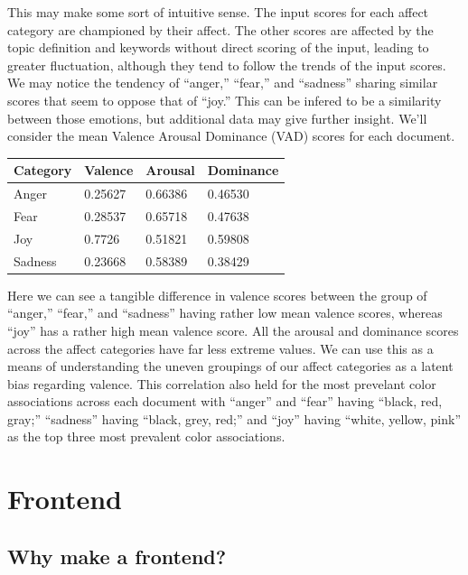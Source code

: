 \documentclass[11pt, twoside, reqno]{book}
\begin{document}
This may make some sort of intuitive sense. The input scores for each affect category are championed by their affect. The other scores are affected by the topic definition and keywords without direct scoring of the input, leading to greater fluctuation, although they tend to follow the trends of the input scores. We may notice the tendency of ``anger,'' ``fear,'' and ``sadness'' sharing similar scores that seem to oppose that of ``joy.'' This can be infered to be a similarity between those emotions, but additional data may give further insight. We'll consider the mean Valence Arousal Dominance (VAD) scores for each document.

\begin{table}[h!]
    \raggedright
    \begin{tabular}{|l|l|l|l|}
    \hline
        Category & Valence & Arousal & Dominance \\ \hline
        Anger & 0.25627 & 0.66386 & 0.46530 \\ \hline
        Fear & 0.28537 & 0.65718 & 0.47638 \\ \hline
        Joy & 0.7726 & 0.51821 & 0.59808 \\ \hline
        Sadness & 0.23668 & 0.58389 & 0.38429 \\ \hline
    \end{tabular}
\end{table}

Here we can see a tangible difference in valence scores between the group of ``anger,'' ``fear,'' and ``sadness'' having rather low mean valence scores, whereas ``joy'' has a rather high mean valence score. All the arousal and dominance scores across the affect categories have far less extreme values. We can use this as a means of understanding the uneven groupings of our affect categories as a latent bias regarding valence. This correlation also held for the most prevelant color associations across each document with ``anger'' and ``fear'' having ``black, red, gray;'' ``sadness'' having ``black, grey, red;'' and ``joy'' having ``white, yellow, pink'' as the top three most prevalent color associations.



\chapter{Frontend}

\section{Why make a frontend?}
\end{document}
